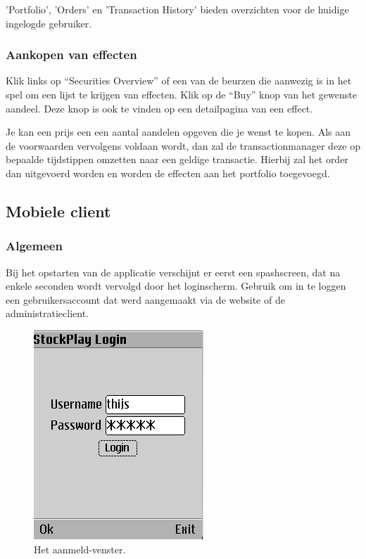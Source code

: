 'Portfolio', 'Orders' en 'Transaction History' bieden overzichten voor de huidige ingelogde gebruiker.

\subsubsection{Aankopen van effecten}

Klik links op ``Securities Overview'' of een van de beurzen die aanwezig is in het spel om een lijst te krijgen van effecten. Klik op de ``Buy'' knop van het gewenste aandeel. Deze knop is ook te vinden op een detailpagina van een effect.

Je kan een prijs een een aantal aandelen opgeven die je wenst te kopen. Als aan de voorwaarden vervolgens voldaan wordt, dan zal de transactionmanager deze op bepaalde tijdstippen omzetten naar een geldige transactie. Hierbij zal het order dan uitgevoerd worden en worden de effecten aan het portfolio toegevoegd.

\subsection{Mobiele client}

\subsubsection{Algemeen}
Bij het opstarten van de applicatie verschijnt er eerst een spashscreen, dat na enkele seconden wordt vervolgd door het loginscherm. Gebruik om in te loggen een gebruikersaccount dat werd aangemaakt via de website of de administratieclient.
\begin{figure}[h!]
	\centering
		\includegraphics[scale=0.75]{images/handleiding/mobile/Login}
	\caption{Het aanmeld-venster.}
	\label{fig:handl:mobile:login}
\end{figure}

